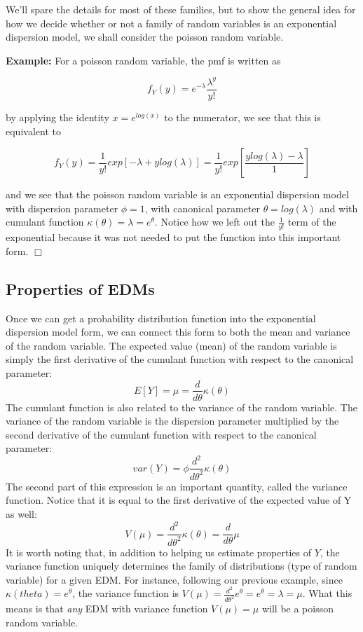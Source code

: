 \documentclass[
]{book}
\begin{document}
We'll spare the details for most of these families, but to show the general idea for how we decide whether or not a family of random variables is an exponential dispersion model, we shall consider the poisson random variable.

\textbf{Example:} For a poisson random variable, the pmf is written as

\[
f_Y(y) = e^{-\lambda}\frac{\lambda^y}{y!}
\]

by applying the identity \(x=e^{log(x)}\) to the numerator, we see that this is equivalent to

\[
f_Y(y) =\frac{1}{y!} exp\left[-\lambda + y log(\lambda) \right] 
= \frac{1}{y!} exp\left[\frac{y log(\lambda) -\lambda}{1} \right] 
\]

and we see that the poisson random variable is an exponential dispersion model with dispersion parameter \(\phi = 1\), with canonical parameter \(\theta = log(\lambda)\) and with cumulant function \(\kappa(\theta) = \lambda = e^\theta\). Notice how we left out the \(\frac{1}{y!}\) term of the exponential because it was not needed to put the function into this important form. \(\Box\)

\hypertarget{properties-of-edms}{%
\subsection{Properties of EDMs}\label{properties-of-edms}}

Once we can get a probability distribution function into the exponential dispersion model form, we can connect this form to both the mean and variance of the random variable. The expected value (mean) of the random variable is simply the first derivative of the cumulant function with respect to the canonical parameter:
\[
E[Y] =\mu= \frac{d}{d\theta}\kappa(\theta)
\]
The cumulant function is also related to the variance of the random variable. The variance of the random variable is the dispersion parameter multiplied by the second derivative of the cumulant function with respect to the canonical parameter:
\[
var(Y) = \phi \frac{d^2}{d\theta^2} \kappa(\theta)
\]
The second part of this expression is an important quantity, called the variance function. Notice that it is equal to the first derivative of the expected value of Y as well:
\[
V(\mu) = \frac{d^2}{d\theta^2} \kappa(\theta) = \frac{d}{d\theta}\mu
\]
It is worth noting that, in addition to helping us estimate properties of \(Y\), the variance function uniquely determines the family of distributions (type of random variable) for a given EDM. For instance, following our previous example, since \(\kappa(theta) = e^{\theta}\), the variance function is \(V(\mu) = \frac{d^2}{d\theta^2} e^\theta = e^\theta = \lambda = \mu\). What this means is that \emph{any} EDM with variance function \(V(\mu) = \mu\) will be a poisson random variable.
\end{document}
